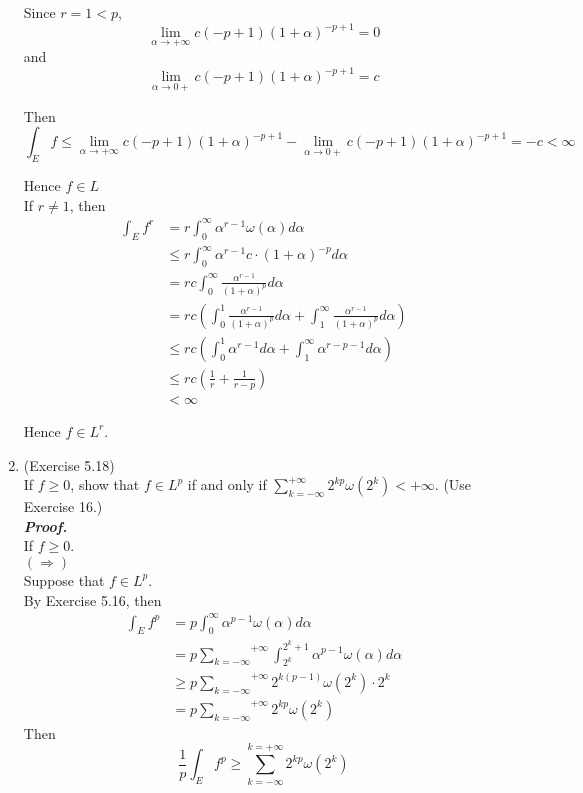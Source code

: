 \documentclass[a4paper,11pt]{article}
\begin{document}
\begin{enumerate}
 Since $r = 1 < p$,
 $$\underset{\alpha \to +\infty}{\lim} c(-p+1)(1+\alpha)^{-p+1} = 0$$
 and
 $$\underset{\alpha \to 0+}{\lim} c(-p+1)(1+\alpha)^{-p+1} = c$$
 
 Then
 $$\int_E f 
 \leq \underset{\alpha \to +\infty}{\lim} c(-p+1)(1+\alpha)^{-p+1}
 - \underset{\alpha \to 0+}{\lim} c(-p+1)(1+\alpha)^{-p+1}
 = -c < \infty$$

 Hence $f \in L$\\


 If $r \neq 1$, then
 $$\begin{aligned}
 \int_E f^r
 &= r \int_0^\infty \alpha^{r-1} \omega(\alpha) d \alpha\\
 &\leq r \int_0^\infty \alpha^{r-1} c \cdot (1+\alpha)^{-p} d \alpha\\
 &= rc \int_0^\infty \frac{\alpha^{r-1}}{(1+\alpha)^p} d \alpha\\
 &= rc \left( \int_0^1 \frac{\alpha^{r-1}}{(1+\alpha)^p} d \alpha 
 + \int_1^\infty \frac{\alpha^{r-1}}{(1+\alpha)^p} d \alpha \right)\\
 &\leq rc \left( \int_0^1 \alpha^{r-1} d \alpha 
 + \int_1^\infty \alpha^{r - p - 1} d \alpha \right)\\
 &\leq rc \left( \frac{1}{r} + \frac{1}{r - p} \right)\\
 &< \infty
 \end{aligned}$$

 Hence $f \in L^r$.\\




\item (Exercise 5.18)\\
 If $f \geq 0$, show that $f \in L^p$ if and only if $\sum_{k = -\infty}^{+\infty} 2^{kp} \omega(2^k) < +\infty$. (Use Exercise 16.)\\
 \newline
 \textit{\textbf {Proof.}}\\

 If $f \geq 0$.\\

 $(\Rightarrow)$\\
 Suppose that $f \in L^p$.\\
 By Exercise 5.16, then
 $$\begin{aligned}
 \int_E f^p
 &= p \int_0^\infty \alpha^{p-1} \omega(\alpha) d \alpha\\
 &= p \overset{+\infty}{\underset{k = -\infty}{\sum}} \int_{2^{k}}^{2^k+1} \alpha^{p-1} \omega(\alpha) d \alpha\\
 &\geq p \overset{+\infty}{\underset{k = -\infty}{\sum}} 2^{k(p-1)} \omega(2^k) \cdot 2^k\\
 &= p \overset{+\infty}{\underset{k = -\infty}{\sum}} 2^{kp} \omega(2^k)
 \end{aligned}$$
 Then
 $$\frac{1}{p} \int_E f^p \geq \overset{k = +\infty}{\underset{k = -\infty}{\sum}} 2^{kp} \omega(2^k)$$
 

\end{enumerate}
\end{document}
